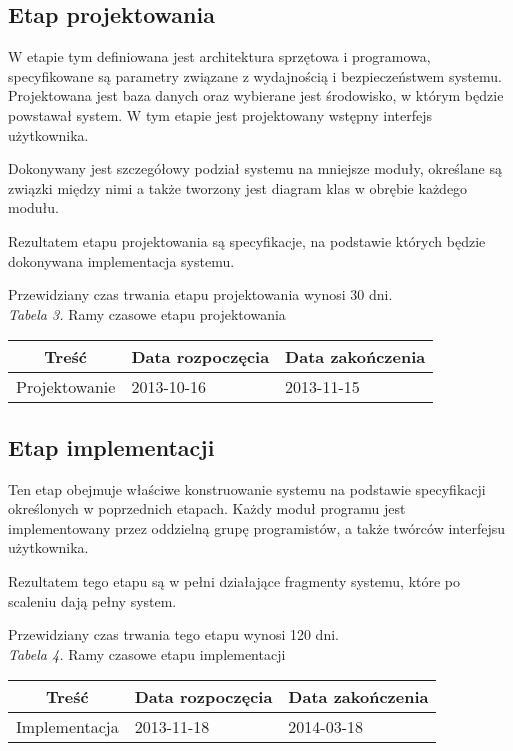 \documentclass [11pt, a4paper, leqno]	{article}	%
\begin{document}
\subsection{Etap projektowania}
\noindent
W etapie tym definiowana jest architektura sprzętowa i programowa, specyfikowane są parametry związane z wydajnością i bezpieczeństwem systemu. Projektowana jest baza danych oraz wybierane jest środowisko, w którym będzie powstawał system. W tym etapie jest projektowany wstępny interfejs użytkownika. 

Dokonywany jest szczegółowy podział systemu na mniejsze moduły, określane są związki między nimi a także tworzony jest diagram klas w obrębie każdego modułu.

Rezultatem etapu projektowania są specyfikacje, na podstawie których będzie dokonywana implementacja systemu. 

Przewidziany czas trwania etapu projektowania wynosi 30 dni. \\

\textit{Tabela 3.} Ramy czasowe etapu projektowania

\begin{center}
	\begin{tabular}{| l | l | l |}
		\hline
		\multicolumn{1}{|c|}{Treść} & 
		\multicolumn{1}{|c|}{Data rozpoczęcia} & 
		\multicolumn{1}{|c|}{Data zakończenia} \\ \hline \hline
		Projektowanie & 2013-10-16 & 2013-11-15 \\ \hline
	\end{tabular}
\end{center}

\subsection{Etap implementacji}
\noindent
Ten etap obejmuje właściwe konstruowanie systemu na podstawie specyfikacji określonych w poprzednich etapach. Każdy moduł programu jest implementowany przez oddzielną grupę programistów, a także twórców interfejsu użytkownika. 

Rezultatem tego etapu są w pełni działające fragmenty systemu, które po scaleniu dają pełny system.

Przewidziany czas trwania tego etapu wynosi 120 dni. \\

\textit{Tabela 4.} Ramy czasowe etapu implementacji

\begin{center}
	\begin{tabular}{| l | l | l |}
		\hline
		\multicolumn{1}{|c|}{Treść} & 
		\multicolumn{1}{|c|}{Data rozpoczęcia} & 
		\multicolumn{1}{|c|}{Data zakończenia} \\ \hline \hline
		Implementacja & 2013-11-18 & 2014-03-18 \\ \hline
	\end{tabular}
\end{center}
\end{document}
